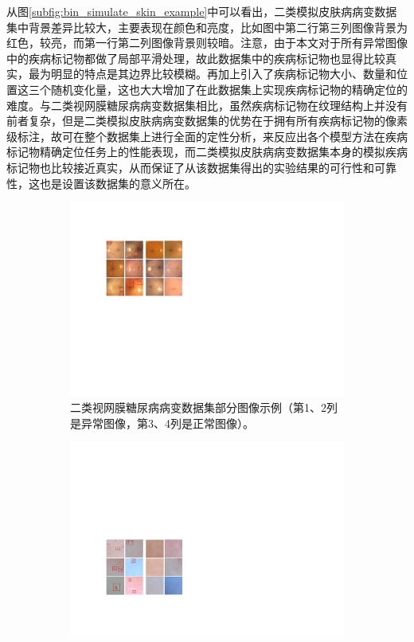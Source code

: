 从图\ref{subfig:bin_simulate_skin_example}中可以看出，二类模拟皮肤病病变数据集中背景差异比较大，主要表现在颜色和亮度，比如图中第二行第三列图像背景为红色，较亮，而第一行第二列图像背景则较暗。注意，由于本文对于所有异常图像中的疾病标记物都做了局部平滑处理，故此数据集中的疾病标记物也显得比较真实，最为明显的特点是其边界比较模糊。再加上引入了疾病标记物大小、数量和位置这三个随机变化量，这也大大增加了在此数据集上实现疾病标记物的精确定位的难度。与二类视网膜糖尿病病变数据集相比，虽然疾病标记物在纹理结构上并没有前者复杂，但是二类模拟皮肤病病变数据集的优势在于拥有所有疾病标记物的像素级标注，故可在整个数据集上进行全面的定性分析，来反应出各个模型方法在疾病标记物精确定位任务上的性能表现，而二类模拟皮肤病病变数据集本身的模拟疾病标记物也比较接近真实，从而保证了从该数据集得出的实验结果的可行性和可靠性，这也是设置该数据集的意义所在。
\begin{figure}[h]
	\centering
	\begin{subfigure}{0.48\textwidth}
		\centering
		\includegraphics[width=1\textwidth]{figure/bin_dr_ds_example}
		\caption{二类视网膜糖尿病病变数据集部分图像示例（第1、2列是异常图像，第3、4列是正常图像）。}
		\label{subfig:bin_dr_ds_example}
	\end{subfigure}
	\quad
	\begin{subfigure}{0.48\textwidth}
		\centering
		\includegraphics[width=1\textwidth]{figure/bin_simulate_skin_example}

\end{subfigure}
\end{figure}
